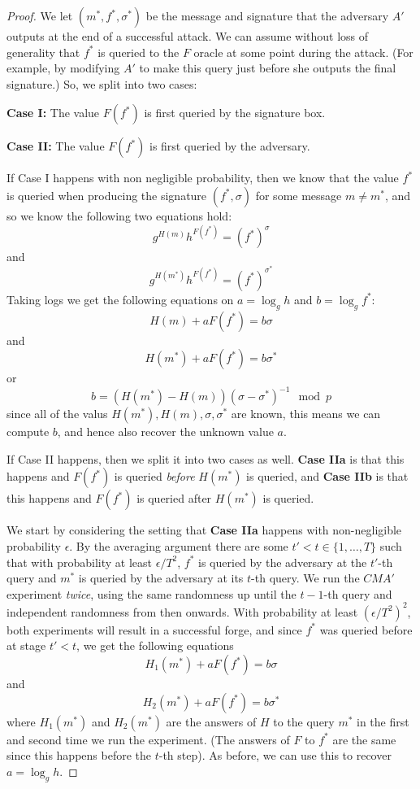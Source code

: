 \begin{proof}
We let \((m^*,f^*,\sigma^*)\) be the message and signature that the
adversary \(A'\) outputs at the end of a successful attack. We can
assume without loss of generality that \(f^*\) is queried to the \(F\)
oracle at some point during the attack. (For example, by modifying
\(A'\) to make this query just before she outputs the final signature.)
So, we split into two cases:

\textbf{Case I:} The value \(F(f^*)\) is first queried by the signature
box.

\textbf{Case II:} The value \(F(f^*)\) is first queried by the
adversary.

If Case I happens with non negligible probability, then we know that the
value \(f^*\) is queried when producing the signature \((f^*,\sigma)\)
for some message \(m \neq m^*\), and so we know the following two
equations hold: \[ g^{H(m)}h^{F(f^*)} = (f^*)^{\sigma}\] and
\[ g^{H(m^*)}h^{F(f^*)}=  (f^*)^{\sigma^*}\] Taking logs we get the
following equations on \(a = \log_g h\) and \(b=\log_g f^*\):
\[H(m)+aF(f^*) = b\sigma\] and \[H(m^*)+aF(f^*)=b\sigma^*\] or
\[b= (H(m^*)-H(m))(\sigma-\sigma^*)^{-1} \mod p\] since all of the valus
\(H(m^*),H(m),\sigma,\sigma^*\) are known, this means we can compute
\(b\), and hence also recover the unknown value \(a\).

If Case II happens, then we split it into two cases as well.
\textbf{Case IIa} is that this happens and \(F(f^*)\) is queried
\emph{before} \(H(m^*)\) is queried, and \textbf{Case IIb} is that this
happens and \(F(f^*)\) is queried after \(H(m^*)\) is queried.

We start by considering the setting that \textbf{Case IIa} happens with
non-negligible probability \(\epsilon\). By the averaging argument there
are some \(t'< t \in \{1,\ldots,T\}\) such that with probability at
least \(\epsilon/T^2\), \(f^*\) is queried by the adversary at the
\(t'\)-th query and \(m^*\) is queried by the adversary at its \(t\)-th
query. We run the \(\ensuremath{\mathit{CMA}}'\) experiment
\emph{twice}, using the same randomness up until the \(t-1\)-th query
and independent randomness from then onwards. With probability at least
\((\epsilon/T^2)^2\), both experiments will result in a successful
forge, and since \(f^*\) was queried before at stage \(t'<t\), we get
the following equations \[H_1(m^*)+aF(f^*) = b\sigma\] and
\[H_2(m^*)+aF(f^*)=b\sigma^*\] where \(H_1(m^*)\) and \(H_2(m^*)\) are
the answers of \(H\) to the query \(m^*\) in the first and second time
we run the experiment. (The answers of \(F\) to \(f^*\) are the same
since this happens before the \(t\)-th step). As before, we can use this
to recover \(a=\log_g h\).


\end{proof}
